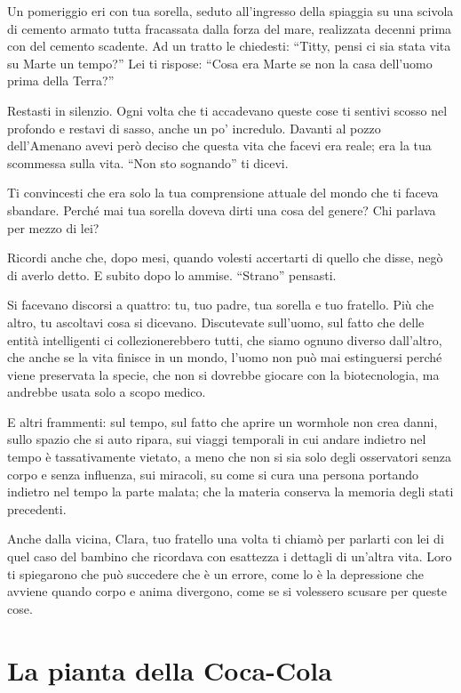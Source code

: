 Un pomeriggio eri con tua sorella, seduto all'ingresso della spiaggia su una scivola di cemento armato tutta fracassata dalla forza del mare, realizzata decenni prima con del cemento scadente. Ad un tratto le chiedesti: “Titty, pensi ci sia stata vita su Marte un tempo?” Lei ti rispose: “Cosa era Marte se non la casa dell'uomo prima della Terra?”

Restasti in silenzio. Ogni volta che ti accadevano queste cose ti sentivi scosso nel profondo e restavi di sasso, anche un po' incredulo. Davanti al pozzo dell'Amenano avevi però deciso che questa vita che facevi era reale; era la tua scommessa sulla vita. “Non sto sognando” ti dicevi.

Ti convincesti che era solo la tua comprensione attuale del mondo che ti faceva sbandare. Perché mai tua sorella doveva dirti una cosa del genere? Chi parlava per mezzo di lei?

Ricordi anche che, dopo mesi, quando volesti accertarti di quello che disse, negò di averlo detto. E subito dopo lo ammise. “Strano” pensasti.

Si facevano discorsi a quattro: tu, tuo padre, tua sorella e tuo fratello. Più che altro, tu ascoltavi cosa si dicevano. Discutevate sull'uomo, sul fatto che delle entità intelligenti ci collezionerebbero tutti, che siamo ognuno diverso dall'altro, che anche se la vita finisce in un mondo, l'uomo non può mai estinguersi perché viene preservata la specie, che non si dovrebbe giocare con la biotecnologia, ma andrebbe usata solo a scopo medico.

E altri frammenti: sul tempo, sul fatto che aprire un wormhole non crea danni, sullo spazio che si auto ripara, sui viaggi temporali in cui andare indietro nel tempo è tassativamente vietato, a meno che non si sia solo degli osservatori senza corpo e senza influenza, sui miracoli, su come si cura una persona portando indietro nel tempo la parte malata; che la materia conserva la memoria degli stati precedenti.

Anche dalla vicina, Clara, tuo fratello una volta ti chiamò per parlarti con lei di quel caso del bambino che ricordava con esattezza i dettagli di un'altra vita. Loro ti spiegarono che può succedere che è un errore, come lo è la depressione che avviene quando corpo e anima divergono, come se si volessero scusare per queste cose.%

\section{La pianta della Coca-Cola}
\label{pianta_della_coca_cola}

